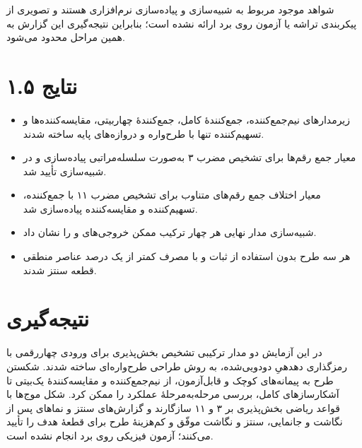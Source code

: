 \documentclass[12pt,a4paper]{article}
\begin{document}

	شواهد موجود مربوط به شبیه‌سازی و پیاده‌سازی نرم‌افزاری هستند و تصویری از پیکربندی تراشه یا آزمون روی برد ارائه نشده است؛ بنابراین نتیجه‌گیری این گزارش به همین مراحل محدود می‌شود.

	\section*{۱.۵ نتایج}
	\begin{itemize}
		\item زیرمدارهای نیم‌جمع‌کننده، جمع‌کنندهٔ کامل، جمع‌کنندهٔ چهاربیتی، مقایسه‌کننده‌ها و تسهیم‌کننده تنها با طرح‌واره و دروازه‌های پایه ساخته شدند.
		\item معیار جمع رقم‌ها برای تشخیص مضرب ۳ به‌صورت سلسله‌مراتبی پیاده‌سازی و در شبیه‌سازی تأیید شد.
		\item معیار اختلاف جمع رقم‌های متناوب برای تشخیص مضرب ۱۱ با جمع‌کننده، تسهیم‌کننده و مقایسه‌کننده پیاده‌سازی شد.
		\item شبیه‌سازی مدار نهایی هر چهار ترکیب ممکن خروجی‌های  و  را نشان داد.
		\item هر سه طرح بدون استفاده از ثبات و با مصرف کمتر از یک درصد عناصر منطقی قطعه سنتز شدند.
	\end{itemize}

	\section*{نتیجه‌گیری}
	در این آزمایش دو مدار ترکیبی تشخیص بخش‌پذیری برای ورودی چهاررقمی با رمزگذاری دهدهیِ دودویی‌شده، به روش طراحی طرح‌واره‌ای ساخته شدند. شکستن طرح به پیمانه‌های کوچک و قابل‌آزمون، از نیم‌جمع‌کننده و مقایسه‌کنندهٔ یک‌بیتی تا آشکارسازهای کامل، بررسی مرحله‌به‌مرحلهٔ عملکرد را ممکن کرد. شکل موج‌ها با قواعد ریاضی بخش‌پذیری بر ۳ و ۱۱ سازگارند و گزارش‌های سنتز و نماهای پس از نگاشت و جانمایی، سنتز و نگاشت موفّق و کم‌هزینهٔ طرح برای قطعهٔ هدف  را تأیید می‌کنند؛ آزمون فیزیکی روی برد انجام نشده است.
\end{document}
